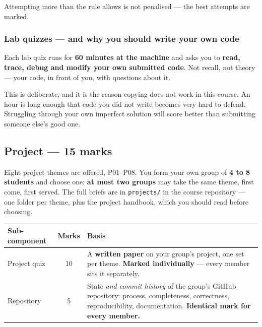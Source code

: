 \documentclass[11pt]{article}
\begin{document}
Attempting more than the rule allows is not penalised --- the best attempts are
marked.

\subsubsection*{Lab quizzes --- and why you should write your own code}

Each lab quiz runs for \textbf{60 minutes at the machine} and asks you to
\textbf{read, trace, debug and modify your own submitted code}. Not recall, not
theory --- your code, in front of you, with questions about it.

\begin{caution}
This is deliberate, and it is the reason copying does not work in this course.
An hour is long enough that code you did not write becomes very hard to defend.
Struggling through your own imperfect solution will score better than submitting
someone else's good one.
\end{caution}

\subsection{Project --- 15 marks}

Eight project themes are offered, P01--P08. You form your own group of
\textbf{4 to 8 students} and choose one; \textbf{at most two groups} may take the
same theme, first come, first served. The full briefs are in
\texttt{projects/} in the course repository --- one folder per theme, plus the
project handbook,
which you should read before choosing.

\begin{center}
\begin{tabular}{@{}p{5.4cm}cp{6.8cm}@{}}
\toprule
\textbf{Sub-component} & \textbf{Marks} & \textbf{Basis}\\
\midrule
Project quiz & 10 & A \textbf{written paper} on your group's project, one set per theme. \textbf{Marked individually} --- every member sits it separately.\\
Repository & 5 & State \emph{and commit history} of the group's GitHub repository: process, completeness, correctness, reproducibility, documentation. \textbf{Identical mark for every member.}\\
\bottomrule
\end{tabular}
\end{center}
\end{document}
